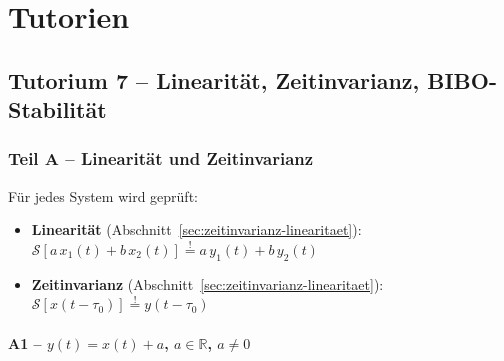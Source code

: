 \chapter{Tutorien}

\section{Tutorium 7 – Linearität, Zeitinvarianz, BIBO-Stabilität}

\subsection*{Teil A – Linearität und Zeitinvarianz}

Für jedes System wird geprüft:
\begin{itemize}
  \item \textbf{Linearität} (Abschnitt~\ref{sec:zeitinvarianz-linearitaet}):
  $\mathcal{S}[a\,x_1(t) + b\,x_2(t)] \stackrel{!}{=} a\,y_1(t) + b\,y_2(t)$
  \item \textbf{Zeitinvarianz} (Abschnitt~\ref{sec:zeitinvarianz-linearitaet}):
  $\mathcal{S}[x(t - \tau_0)] \stackrel{!}{=} y(t - \tau_0)$
\end{itemize}

\subsubsection*{A1 – $y(t) = x(t) + a$, \quad $a \in \mathbb{R}$, $a \neq 0$}

